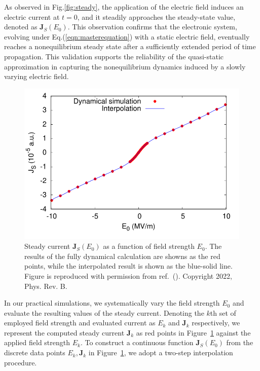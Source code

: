 As observed in Fig.\ref{fig:steady}, the application of the electric field induces an electric current at $t=0$, and it steadily approaches the steady-state value, denoted as $\mathbf J_S(E_0)$. This observation confirms that the electronic system, evolving under Eq.(\ref{eqn:masterequation}) with a static electric field, eventually reaches a nonequilibrium steady state after a sufficiently extended period of time propagation. This validation supports the reliability of the quasi-static approximation in capturing the nonequilibrium dynamics induced by a slowly varying electric field.
\begin{figure}[htbp]
	\centering
	\includegraphics[width=0.8\linewidth]{pic/jsteady_interpolate.pdf}
	\caption{\label{fig:insert}
		Steady current $\mathbf J_S(E_0)$ as a function of field strength $E_0$. The results of the fully dynamical calculation are showns as the red points, while the interpolated result is shown as the blue-solid line. Figure is reproduced with permission from ref.~(\cite{PhysRevB.106.024313}). Copyright 2022, Phys. Rev. B.}
\end{figure}

In our practical simulations, we systematically vary the field strength $E_0$ and evaluate the resulting values of the steady current. Denoting the $k$th set of employed field strength and evaluated current as $E_k$ and $\mathbf J_k$ respectively, we represent the computed steady current $\mathbf J_k$ as red points in Figure~\ref{fig:insert} against the applied field strength $E_k$. To construct a continuous function $\mathbf J_S(E_0)$ from the discrete data points ${E_k, \mathbf J_k}$ in Figure~\ref{fig:insert}, we adopt a two-step interpolation procedure.

